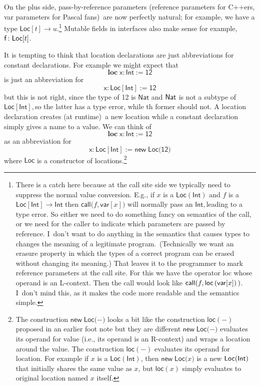 \documentclass[12pt]{article}
\begin{document}
On the plus side, pass-by-reference parameters (reference parameters for
C++ers, var parameters for Pascal fans)\ are now perfectly natural; for
example, we have a type $\mathsf{Loc}[t]\rightarrow u$.\footnote{%
There is a catch here because at the call site side we typically need to
suppress the normal value conversion. E.g., if $x$ is a $\mathsf{Loc(Int)}$
and $f$ is a $\mathsf{Loc[Int]\rightarrow Int}$ then $\mathsf{call(}f,%
\mathsf{var}[x]\mathsf{)}$ will normally pass an $\mathsf{Int,}$leading to a
type error. So either we need to do something fancy on semantics of the
call, or we need for the caller to indicate which parameters are passed by
reference. I\ don't want to do anything in the semantics that causes types
to changes the meaning of a legitimate program.\ (Technically we want an
erasure property in which the types of a correct program can be erased
without changing its meaning.) That leaves it to the programmer to mark
reference parameters at the call site. For this we have the operator \textsf{%
loc} whose operand is an L-context. Then the call would look like $\mathsf{%
call(}f,\mathsf{loc}\left( \mathsf{var}[x]\right) \mathsf{)}$. I\ don't mind
this, as it makes the code more readable and the semantics simple.} Mutable
fields in interfaces also make sense for example, $\mathsf{f}\colon \mathsf{%
Loc}[t]$.

It is tempting to think that location declarations are just abbreviations
for constant declarations. For example we might expect that%
\begin{equation*}
\mathbf{loc}\;\mathsf{x}:\mathsf{Int:=12}
\end{equation*}%
is just an abbreviation for%
\begin{equation*}
\mathsf{x}:\mathsf{Loc}[\mathsf{Int}]:=\mathsf{12}
\end{equation*}%
but this is not right, since the type of 12 is $\mathsf{Nat}$ and $\mathsf{%
Nat}$ is not a subtype of $\mathsf{Loc}[\mathsf{Int}],$so the latter has a
type error, while th former should not. A location declaration creates (at
runtime)\ a new location while a constant declaration simply gives a name to
a value. We can think of%
\begin{equation*}
\mathbf{loc}\;\mathsf{x}:\mathsf{Int:=12}
\end{equation*}%
as an abbreviation for%
\begin{equation*}
\mathsf{x}:\mathsf{Loc}[\mathsf{Int}]:=\mathsf{new\;Loc}(\mathsf{12)}
\end{equation*}%
where $\mathsf{Loc}$ is a constructor of locations.\footnote{%
The construction $\mathsf{new\;Loc}(\mathsf{-)}$ looks a bit like the
construction $\mathsf{loc}\left( \mathsf{-}\right) $ proposed in an earlier
foot note but they are different $\mathsf{new\;Loc}(\mathsf{-)}$ evaluates
its operand for value (i.e., its operand is an R-context) and wraps a
location around the value. The construction $\mathsf{loc}\left( \mathsf{-}%
\right) $ evaluates its operand for location. For example if $x$ is a $%
\mathsf{Loc(Int)}$, then $\mathsf{new\;Loc}(x\mathsf{)}$ is a new $\mathsf{%
Loc(Int)}$ that initially shares the same value as $x$, but $\mathsf{loc}%
\left( x\right) $ simply evaluates to original location named $x$ itself.}
\end{document}
